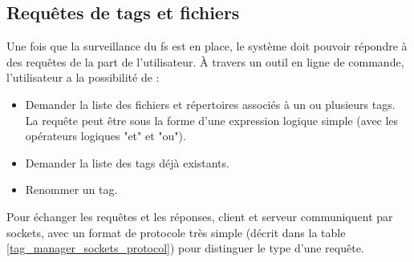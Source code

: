 \subsection{Requêtes de tags et fichiers}
Une fois que la surveillance du \acrshort{fs} est en place, le système doit pouvoir répondre 
à des requêtes de la part de l'utilisateur. À travers un outil en ligne de commande, l'utilisateur 
a la possibilité de : 
\begin{itemize}
    \item Demander la liste des fichiers et répertoires associés à un ou plusieurs tags. La requête 
        peut être sous la forme d'une expression logique simple (avec les opérateurs logiques "et" 
        et "ou").
    \item Demander la liste des tags déjà existants. 
    \item Renommer un tag. 
\end{itemize}
Pour échanger les requêtes et les réponses, client et serveur communiquent par sockets, avec un 
format de protocole très simple (décrit dans la table \ref{tag_manager_sockets_protocol}) pour 
distinguer le type d'une requête.
